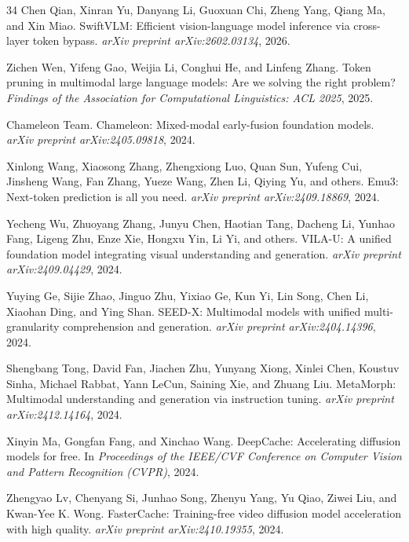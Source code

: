\documentclass{article}
\begin{document}
\begin{thebibliography}{34}
Chen Qian, Xinran Yu, Danyang Li, Guoxuan Chi, Zheng Yang, Qiang Ma, and Xin Miao.
\newblock SwiftVLM: Efficient vision-language model inference via cross-layer token bypass.
\newblock \emph{arXiv preprint arXiv:2602.03134}, 2026.

Zichen Wen, Yifeng Gao, Weijia Li, Conghui He, and Linfeng Zhang.
\newblock Token pruning in multimodal large language models: Are we solving the right problem?
\newblock \emph{Findings of the Association for Computational Linguistics: ACL 2025}, 2025.

Chameleon Team.
\newblock Chameleon: Mixed-modal early-fusion foundation models.
\newblock \emph{arXiv preprint arXiv:2405.09818}, 2024.

Xinlong Wang, Xiaosong Zhang, Zhengxiong Luo, Quan Sun, Yufeng Cui, Jinsheng Wang, Fan Zhang, Yueze Wang, Zhen Li, Qiying Yu, and others.
\newblock Emu3: Next-token prediction is all you need.
\newblock \emph{arXiv preprint arXiv:2409.18869}, 2024.

Yecheng Wu, Zhuoyang Zhang, Junyu Chen, Haotian Tang, Dacheng Li, Yunhao Fang, Ligeng Zhu, Enze Xie, Hongxu Yin, Li Yi, and others.
\newblock VILA-U: A unified foundation model integrating visual understanding and generation.
\newblock \emph{arXiv preprint arXiv:2409.04429}, 2024.

Yuying Ge, Sijie Zhao, Jinguo Zhu, Yixiao Ge, Kun Yi, Lin Song, Chen Li, Xiaohan Ding, and Ying Shan.
\newblock SEED-X: Multimodal models with unified multi-granularity comprehension and generation.
\newblock \emph{arXiv preprint arXiv:2404.14396}, 2024.

Shengbang Tong, David Fan, Jiachen Zhu, Yunyang Xiong, Xinlei Chen, Koustuv Sinha, Michael Rabbat, Yann LeCun, Saining Xie, and Zhuang Liu.
\newblock MetaMorph: Multimodal understanding and generation via instruction tuning.
\newblock \emph{arXiv preprint arXiv:2412.14164}, 2024.

Xinyin Ma, Gongfan Fang, and Xinchao Wang.
\newblock DeepCache: Accelerating diffusion models for free.
\newblock In \emph{Proceedings of the IEEE/CVF Conference on Computer Vision and Pattern Recognition (CVPR)}, 2024.

Zhengyao Lv, Chenyang Si, Junhao Song, Zhenyu Yang, Yu Qiao, Ziwei Liu, and Kwan-Yee K. Wong.
\newblock FasterCache: Training-free video diffusion model acceleration with high quality.
\newblock \emph{arXiv preprint arXiv:2410.19355}, 2024.


\end{thebibliography}
\end{document}
